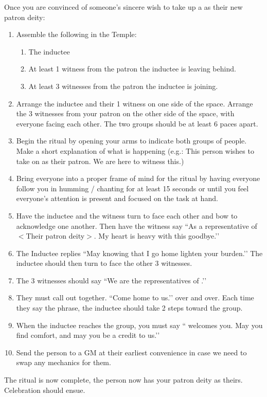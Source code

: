 \documentclass[green]{GL2020}
\begin{document}
Once you are convinced of someone’s sincere wish to take up a \cTechGod{} as their new patron deity:
  \begin{enumerate}
    \item Assemble the following in the Temple:
    \begin{enumerate}
      \item The inductee
      \item At least 1 witness from the patron the inductee is leaving behind.
      \item At least 3 witnesses from the patron the inductee is joining.
    \end{enumerate}
    \item Arrange the inductee and their 1 witness on one side of the space. Arrange the 3 witnesses from your patron on the other side of the space, with everyone facing each other. The two groups should be at least 6 paces apart.
    \item Begin the ritual by opening your arms to indicate both groups of people. Make a short explanation of what is happening (e.g.: This person wishes to take on \cTechGod{} as their patron. We are here to witness this.)
    \item Bring everyone into a proper frame of mind for the ritual by having everyone follow you in humming / chanting for at least 15 seconds or until you feel everyone’s attention is present and focused on the task at hand.
    \item Have the inductee and the witness turn to face each other and bow to acknowledge one another. Then have the witness say ``As a representative of $<$Their patron deity$>$. My heart is heavy with this goodbye.’’
    \item The Inductee replies ``May knowing that I go home lighten your burden.’’ The inductee should then turn to face the other 3 witnesses.
    \item The 3 witnesses should say ``We are the representatives of \cTechGod{}.’’
    \item They must call out together. ``Come home to us.’’ over and over. Each time they say the phrase, the inductee should take 2 steps toward the group.
    \item When the inductee reaches the group, you must say ``\cTechGod{} welcomes you. May you find comfort, and may you be a credit to us.’’
    \item Send the person to a GM at their earliest convenience in case we need to swap any mechanics for them.
  \end{enumerate}
The ritual is now complete, the person now has your patron deity as theirs. Celebration should ensue.
   
\end{document}
